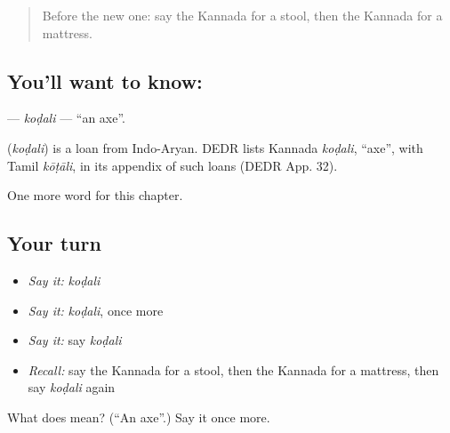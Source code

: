 \label{lesson:KA-C190-kodali}



\begin{quote}
Before the new one: say the Kannada for a stool, then the Kannada for a mattress.
\end{quote}

\subsection*{You'll want to know: }
\textbf{} — \emph{koḍali} — \textquotedblleft{}an axe\textquotedblright{}.

\begin{cousinweb}
\textbf{} (\emph{koḍali}) is a loan from Indo-Aryan. DEDR lists Kannada \emph{koḍali}, \textquotedblleft{}axe\textquotedblright{}, with Tamil \emph{kōṭāli}, in its appendix of such loans (DEDR App. 32).
\end{cousinweb}

\begin{grammarlens}[title={What you've built}]
One more word for this chapter.
\end{grammarlens}

\subsection*{Your turn}
\begin{itemize}
\raggedright
  \item \emph{Say it:} \emph{koḍali}
  \item \emph{Say it:} \emph{koḍali}, once more
  \item \emph{Say it:} say \emph{koḍali}
  \item \emph{Recall:} say the Kannada for a stool, then the Kannada for a mattress, then say \emph{koḍali} again
\end{itemize}

\begin{tcolorbox}[breakable,colback=teal!4,colframe=teal!35!black,title={Before you move on}]
What does  mean? (\textquotedblleft{}An axe\textquotedblright{}.) Say it once more.
\end{tcolorbox}
